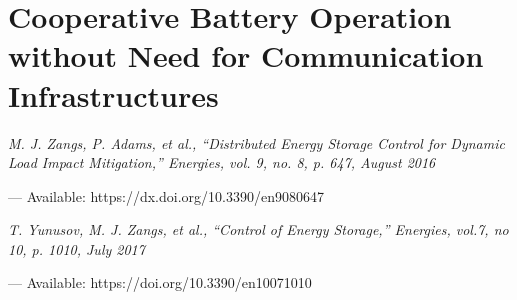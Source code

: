 \chapter{Cooperative Battery Operation without Need for Communication Infrastructures}
\label{ch4}

\singlespacing
\epigraph{\textit{M. J. Zangs, P. Adams, et al., ``Distributed Energy Storage Control for Dynamic Load Impact Mitigation,'' Energies, vol. 9, no. 8, p. 647, August 2016}}{--- Available: https://dx.doi.org/10.3390/en9080647}
\epigraph{\textit{T. Yunusov, M. J. Zangs, et al., ``Control of Energy Storage,'' Energies, vol.7, no 10, p. 1010, July 2017}}{--- Available: https://doi.org/10.3390/en10071010}
\doublespacing













